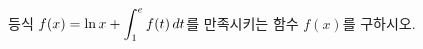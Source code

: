 \hspace*{2mm}\begin{minipage}[t]{\dimexpr\linewidth-2mm\relax}\vspace{0pt}
등식 $f(x)=\ln x+\displaystyle\int_{1}^{e}f(t)\mkern3mu dt$를 만족시키는 함수 $f(x)$를 구하시오.\end{minipage}
